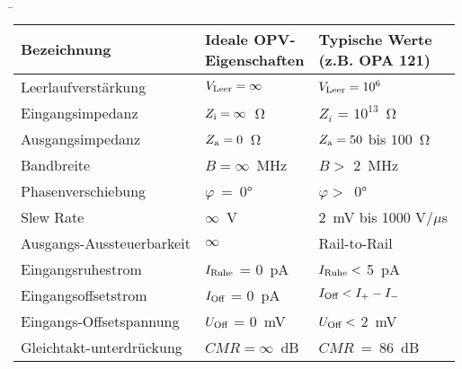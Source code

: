 \begin{frame}
         \b{
            \begin{tabular}{|L{4cm}|L{4cm}|L{4cm}|}
                \hline
                \textbf{Bezeichnung} & \textbf{Ideale OPV- \newline Eigenschaften} & \textbf{Typische Werte \newline (z.B. OPA 121)} \\ 
                \hline
                Leerlaufverstärkung & $V_{\textnormal{Leer}} = \infty$ & $V_{\textnormal{Leer}} = 10^6$\\
                \hline
                Eingangsimpedanz & $Z_{\textnormal{i}} = \infty$~Ω & $Z_i$ = $10^{13}$~Ω\\  
                \hline
                Ausgangsimpedanz & $Z_{\textnormal{a}} = 0$~Ω & $Z_{\textnormal{a}} = 50$ bis $100$~Ω\\
                \hline
                Bandbreite & $B = \infty$~MHz & $B >$ 2~MHz\\   
                \hline
                Phasenverschiebung & $\varphi$~=~0° & $\varphi >$~0°\\
                \hline
                Slew Rate & $\infty$~V & 2~mV bis 1000 V/$\mu$s\\
                \hline
                Ausgangs-Aussteuerbarkeit & $\infty$ & Rail-to-Rail\\
                \hline
                Eingangsruhestrom & $I_{\textnormal{Ruhe}}$ = 0~pA & $I_{\textnormal{Ruhe}} <$ 5~pA\\
                \hline
                Eingangsoffsetstrom & $I_{\textnormal{Off}}$ = 0~pA & $I_{\textnormal{Off}} < I_+-I_-$\\
                \hline
                Eingangs-Offsetspannung & $U_{\textnormal{Off}}$ = 0~mV & $U_{\textnormal{Off}} < $ 2~mV\\
                \hline
                Gleichtakt-\linebreak unterdrückung & $CMR = \infty$~dB  & $CMR$~=~86~dB\\
                \hline
            \end{tabular}}
\end{frame}

